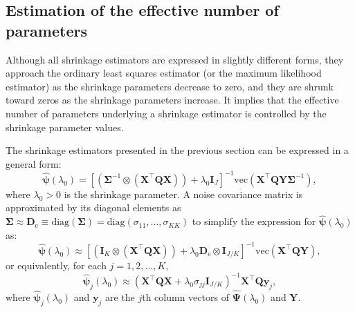 \subsection{Estimation of the effective number of parameters}\label{estimation-of-the-effective-number-of-parameters}

Although all shrinkage estimators are expressed in slightly different forms, they approach the ordinary least squares estimator (or the maximum likelihood estimator) as the shrinkage parameters decrease to zero, and they are shrunk toward zeros as the shrinkage parameters increase.
It implies that the effective number of parameters underlying a shrinkage estimator is controlled by the shrinkage parameter values.

The shrinkage estimators presented in the previous section can be expressed in a general form:
\begin{equation}
    \widehat{\boldsymbol\psi} (\lambda_0)  = \left[\left(\mathbf{\Sigma}^{-1} \otimes \left( \mathbf{X}^\top \mathbf{Q} \mathbf{X} \right) \right) + \lambda_0 \mathbf{I}_J     \right]^{-1} \text{vec}\left( \mathbf{X}^\top \mathbf{Q} \mathbf{Y} \mathbf{\Sigma}^{-1} \right),
    \label{eq:expr-phat-general}
\end{equation}
where \(\lambda_0 > 0\) is the shrinkage parameter.
A noise covariance matrix is approximated by its diagonal elements as \(\mathbf{\Sigma} \approx \mathbf{D}_\text{e} \equiv \text{diag}(\mathbf{\Sigma}) = \text{diag}(\sigma_{11}, \ldots, \sigma_{KK})\) to simplify the expression for \(\widehat{\boldsymbol\psi} (\lambda_0)\) as:
\[
  \widehat{\boldsymbol\psi} (\lambda_0)  
      \approx 
      \left[\left(\mathbf{I}_K \otimes \left( \mathbf{X}^\top \mathbf{Q} \mathbf{X} \right) \right) + \lambda_0 \mathbf{D}_\text{e} \otimes \mathbf{I}_{J/K}   \right]^{-1} \text{vec}\left(\mathbf{X}^\top \mathbf{Q} \mathbf{Y} \right),
  \]
or equivalently, for each \(j=1,2,\ldots,K\),
\begin{equation}
   \widehat{\boldsymbol\psi}_j (\lambda_0)
   \approx
    \left( \mathbf{X}^\top \mathbf{Q} \mathbf{X} + \lambda_0 \sigma_{jj} \mathbf{I}_{J/K} \right)^{-1} 
    \mathbf{X}^\top \mathbf{Q} \mathbf{y}_j
    ,
    \label{eq:expr-phat-general001}
\end{equation}
where \(\widehat{\boldsymbol\psi}_j (\lambda_0)\) and \(\mathbf{y}_j\) are the \(j\)th column vectors of \(\widehat{\boldsymbol\Psi} (\lambda_0)\) and \(\mathbf{Y}\).


